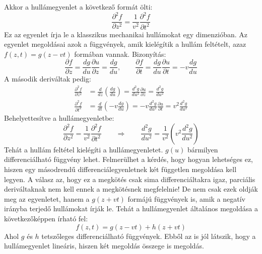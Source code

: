 \documentclass[../main.tex]{subfiles}
\begin{document}
Akkor a hullámegyenlet a következő formát ölti:
\begin{equation}
    \boxed{\frac{\partial^2 f}{\partial z^2} = \frac{1}{v^2} \frac{\partial^2 f}{\partial t^2}}
\end{equation}
Ez az egyenlet írja le a klasszikus mechanikai hullámokat egy dimenzióban. Az egyenlet megoldásai azok a függvények, amik kielégítik a hullám feltételt, azaz $f(z, t) = g(z - vt)$ formában vannak.
Bizonyítás:
\begin{equation}
    \frac{\partial f}{\partial z} = \frac{dg}{du} \frac{\partial u}{\partial z} = \frac{dg}{du}, \qquad \frac{\partial f}{\partial t} = \frac{dg}{du} \frac{\partial u}{\partial t} = -v \frac{dg}{du}
\end{equation}
A második deriváltak pedig:
\begin{equation}
    \begin{aligned}
        \frac{\partial^2 f}{\partial z^2} &= \frac{d}{dz} \left( \frac{dg}{du} \right) = \frac{d^2 g}{du^2} \frac{\partial u}{\partial z} = \frac{d^2 g}{du^2} \\
        \frac{\partial^2 f}{\partial t^2} &= \frac{d}{dt} \left( -v \frac{dg}{du} \right) = -v \frac{d^2 g}{du^2} \frac{\partial u}{\partial t} = v^2 \frac{d^2 g}{du^2}
    \end{aligned}
\end{equation}
Behelyettesítve a hullámegyenletbe:
\begin{equation}
    \frac{\partial^2 f}{\partial z^2} = \frac{1}{v^2} \frac{\partial^2 f}{\partial t^2} \qquad \Rightarrow \qquad \frac{d^2 g}{du^2} = \frac{1}{v^2} \left( v^2 \frac{d^2 g}{du^2} \right)
\end{equation}
Tehát a hullám feltétel kielégíti a hullámegyenletet. $g(u)$ bármilyen differenciálható függvény lehet. Felmerülhet a kérdés, hogy hogyan lehetséges ez, hiszen egy másodrendű differenciálegyenletnek
két független megoldása kell legyen. A válasz az, hogy ez a megkötés csak sima differenciáltakra igaz, parciális deriváltaknak nem kell ennek a megkötésnek megfelelnie! De nem csak ezek oldják meg
az egyenletet, hanem a $g(z + vt)$ formájú függvények is, amik a negatív irányba terjedő hullámokat írják le. Tehát a hullámegyenlet általános megoldása a következőképpen írható fel:
\begin{equation}
    \boxed{f(z, t) = g(z - vt) + h(z + vt)}
\end{equation}
Ahol $g$ és $h$ tetszőleges differenciálható függvények. Ebből az is jól látszik, hogy a hullámegyenlet lineáris, hiszen két megoldás összege is megoldás.
\end{document}
